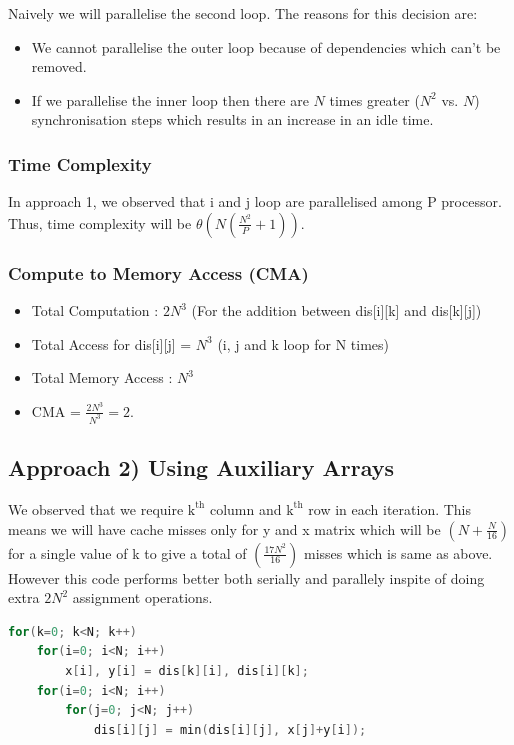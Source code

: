 \documentclass{article}
\begin{document}
Naively we will parallelise the second loop. The reasons for this decision are:
\begin{itemize}
    \item We cannot parallelise the outer loop because of dependencies which can't be removed.
    \item If we parallelise the inner loop then there are $N$ times greater ($N^2$ vs. $N$) synchronisation steps which results in an increase in an idle time. 
\end{itemize}

\subsubsection{Time Complexity}
In approach 1, we observed that i and j loop are parallelised among P processor. Thus, time complexity will be $\theta \left( N \left(\frac{N^2}{P} + 1 \right) \right)$.

\subsubsection{Compute to Memory Access (CMA)}
\begin{itemize}
    \item Total Computation : $2N^3$ (For the addition between dis[i][k] and dis[k][j])
    \item Total Access for dis[i][j] = $N^3$ (i, j and k loop for N times)
    \item Total Memory Access : $N^3$
    \item CMA = $\frac{2N^3}{N^3} = 2$.
\end{itemize}

\subsection{Approach 2) Using Auxiliary Arrays}
We observed that we require $\mathrm{k}^{\mathrm{th}}$ column and $\mathrm{k}^{\mathrm{th}}$ row in each iteration. This means we will have cache misses only for y and x matrix which will be $\left(N + \frac{N}{16}\right)$ for a single value of k to give a total of $\left(\frac{17N^2}{16}\right)$ misses which is same as above. However this code performs better both serially and parallely inspite of doing extra $2N^2$ assignment operations.
\begin{lstlisting}[language=C, caption=Using Auxiliary Arrays]
for(k=0; k<N; k++)
    for(i=0; i<N; i++)
        x[i], y[i] = dis[k][i], dis[i][k];
    for(i=0; i<N; i++)
        for(j=0; j<N; j++)
            dis[i][j] = min(dis[i][j], x[j]+y[i]);
\end{lstlisting}
\end{document}
